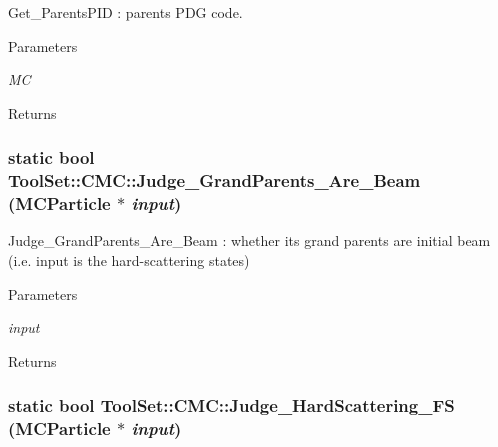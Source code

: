 Get\_\-ParentsPID : parents PDG code. 
\begin{DoxyParams}{Parameters}
\item[{\em MC}]\end{DoxyParams}
\begin{DoxyReturn}{Returns}

\end{DoxyReturn}
\hypertarget{classToolSet_1_1CMC_ad09856f709fff7320c382efd26a408e9}{
\subsubsection[{Judge\_\-GrandParents\_\-Are\_\-Beam}]{\setlength{\rightskip}{0pt plus 5cm}static bool ToolSet::CMC::Judge\_\-GrandParents\_\-Are\_\-Beam (MCParticle $\ast$ {\em input})}}
\label{classToolSet_1_1CMC_ad09856f709fff7320c382efd26a408e9}


Judge\_\-GrandParents\_\-Are\_\-Beam : whether its grand parents are initial beam (i.e. input is the hard-\/scattering states)


\begin{DoxyParams}{Parameters}
\item[{\em input}]\end{DoxyParams}
\begin{DoxyReturn}{Returns}

\end{DoxyReturn}
\hypertarget{classToolSet_1_1CMC_a85fbb7bf0ef846c3ae1dcfeb27853911}{
\subsubsection[{Judge\_\-HardScattering\_\-FS}]{\setlength{\rightskip}{0pt plus 5cm}static bool ToolSet::CMC::Judge\_\-HardScattering\_\-FS (MCParticle $\ast$ {\em input})}}
\label{classToolSet_1_1CMC_a85fbb7bf0ef846c3ae1dcfeb27853911}


